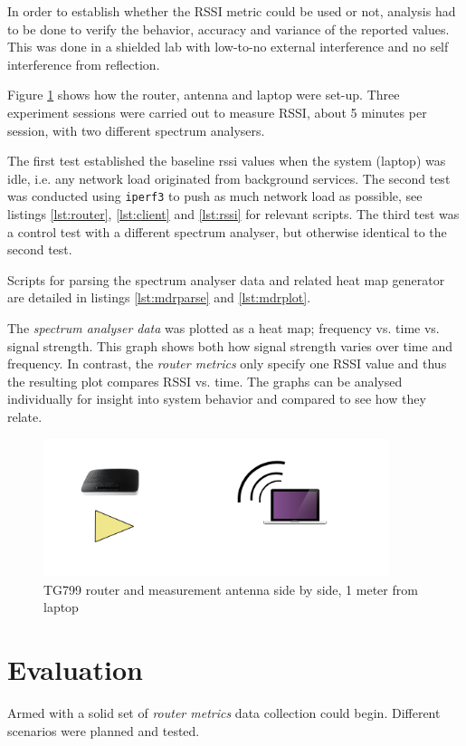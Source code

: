 In order to establish whether the RSSI metric could be used or not, analysis had
to be done to verify the behavior, accuracy and variance of the reported values.
This was done in a shielded lab with low-to-no external interference and no self
interference from reflection.

Figure \ref{fig:rssi_setup} shows how the router, antenna and laptop were
set-up. Three experiment sessions were carried out to measure RSSI, about 5
minutes per session, with two different spectrum analysers.

The first test established the baseline rssi values when the system (laptop) was
idle, i.e. any network load originated from background services. The second test
was conducted using \texttt{iperf3} to push as much network load as possible,
see listings \ref{lst:router}, \ref{lst:client} and \ref{lst:rssi} for relevant
scripts. The third test was a control test with a different spectrum analyser,
but otherwise identical to the second test.

Scripts for parsing the spectrum analyser data and related heat map generator
are detailed in listings \ref{lst:mdrparse} and \ref{lst:mdrplot}.

The \emph{spectrum analyser data} was plotted as a heat map; frequency vs. time
vs. signal strength. This graph shows both how signal strength varies over time
and frequency. In contrast, the \emph{router metrics} only specify one RSSI
value and thus the resulting plot compares RSSI vs. time. The graphs can be
analysed individually for insight into system behavior and compared to see how
they relate.

\begin{figure}
\center
\includegraphics[width=0.9\textwidth]{images/rssi_setup.png}
\caption{TG799 router and measurement antenna side by side, 1 meter from laptop}
\label{fig:rssi_setup}
\end{figure}

\section{Evaluation}

Armed with a solid set of \emph{router metrics} data collection could begin.
Different scenarios were planned and tested.
